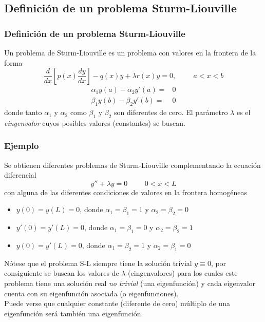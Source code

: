 \subsection{Definici\'{o}n de un problema Sturm-Liouville}
\begin{frame}
\frametitle{Definici\'{o}n de un problema Sturm-Liouville}
Un problema de Sturm-Liouville es un problema con valores en la frontera de la forma
\[\dfrac{d}{dx} \left[ p(x) \dfrac{dy}{dx} \right] - q(x) y + \lambda r(x) y = 0, \hspace{1cm} a<x<b \]
\[ \begin{split}
\alpha_{1} y(a) - \alpha_{2} y'(a) =& 0 \\
\beta_{1} y(b) - \beta_{2} y'(b) =& 0
\end{split} \]
donde tanto $\alpha_{1}$ y $\alpha_{2}$ como $\beta_{1}$ y $\beta_{2}$ son diferentes de cero. El par\'{a}metro $\lambda$ es el \textit{eingenvalor} cuyos posibles valores (constantes) se buscan.
\end{frame}
\begin{frame}
\frametitle{Ejemplo}
Se obtienen diferentes problemas de Sturm-Liouville complementando la ecuaci\'{o}n diferencial
\[ y'' + \lambda y = 0 \hspace{1cm} 0 < x < L\]
con alguna de las diferentes condiciones de valores en la frontera homog\'{e}neas
\begin{itemize}[<+->]
\item $y(0) = y(L) = 0$, donde $\alpha_{1} = \beta_{1} = 1$ y $\alpha_{2} = \beta_{2} = 0$
\item $y'(0) = y'(L) = 0$, donde $\alpha_{1} = \beta_{1} = 0$ y $\alpha_{2} = \beta_{2} = 1$
\item $y(0) = y'(L) = 0$, donde $\alpha_{1} = \beta_{2} = 1$ y $\alpha_{2} = \beta_{1} = 0$
\end{itemize}
\end{frame}
\begin{frame}
N\'{o}tese que el problema S-L siempre tiene la soluci\'{o}n trivial $y \equiv 0$, por consiguiente se buscan los valores de $\lambda$ (eingenvalores) para los cuales este problema tiene una soluci\'{o}n real \textit{no trivial} (una eigenfunci\'{o}n) y cada eigenvalor cuenta con su eigenfunci\'{o}n asociada (o eigenfunciones).
\\
\bigskip
Puede verse que cualquier constante (diferente de cero) m\'{u}ltiplo de una eigenfunci\'{o}n ser\'{a} tambi\'{e}n una eigenfunci\'{o}n.
\end{frame}
